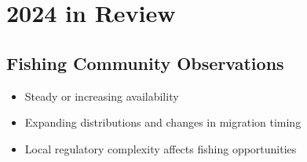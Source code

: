 \documentclass[
  10pt,
  letterpaper,
  DIV=11,
  numbers=noendperiod]{scrartcl}
\providecommand{\tightlist}{%
  \setlength{\itemsep}{0pt}\setlength{\parskip}{0pt}}\usepackage{longtable,booktabs,array}
\begin{document}
\begin{figure}

\begin{minipage}[t]{0.40\linewidth}

{\centering 


}

\end{minipage}%
%
\begin{minipage}[t]{0.03\linewidth}

{\centering 

\hfill

}

\end{minipage}%
%
\begin{minipage}[t]{0.57\linewidth}

{\centering 

\section{2024 in Review}

}

\end{minipage}%
\newline
\begin{minipage}[t]{\linewidth}

{\centering 

\subsection{Fishing Community Observations}

}

\end{minipage}%
\newline
\begin{minipage}[t]{0.57\linewidth}

{\centering 

\begin{itemize}
\tightlist
\item
  Steady or increasing availability
\item
  Expanding distributions and changes in migration timing
\item
  Local regulatory complexity affects fishing opportunities
\end{itemize}

}
\end{minipage}
\end{figure}
\end{document}
